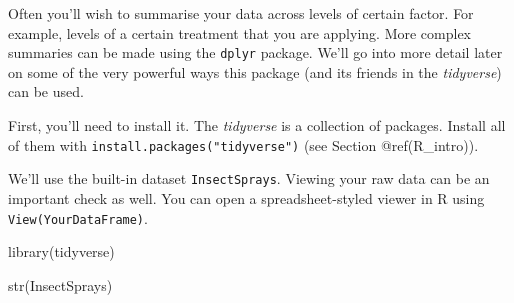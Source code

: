 \documentclass[
  11pt,
  a4paper,
]{book}
\newenvironment{Shaded}{\begin{snugshade}}{\end{snugshade}}
\newcommand{\CommentTok}[1]{\textcolor[rgb]{0.56,0.35,0.01}{\textit{#1}}}
\newcommand{\DecValTok}[1]{\textcolor[rgb]{0.00,0.00,0.81}{#1}}
\newcommand{\FunctionTok}[1]{\textcolor[rgb]{0.00,0.00,0.00}{#1}}
\newcommand{\NormalTok}[1]{#1}
\newcommand{\SpecialCharTok}[1]{\textcolor[rgb]{0.00,0.00,0.00}{#1}}
\newcommand{\StringTok}[1]{\textcolor[rgb]{0.31,0.60,0.02}{#1}}
\begin{document}
\begin{Shaded}
\end{Shaded}

\begin{Shaded}
\end{Shaded}

Often you'll wish to summarise your data across levels of certain factor. For example, levels of a certain treatment that you are applying. More complex summaries can be made using the \texttt{dplyr} package. We'll go into more detail later on some of the very powerful ways this package (and its friends in the \emph{tidyverse}) can be used.

First, you'll need to install it. The \emph{tidyverse} is a collection of packages. Install all of them with \texttt{install.packages("tidyverse")} (see Section @ref(R\_intro)).

We'll use the built-in dataset \texttt{InsectSprays}. Viewing your raw data can be an important check as well. You can open a spreadsheet-styled viewer in R using \texttt{View(YourDataFrame)}.

\begin{Shaded}
\begin{Highlighting}[]
\FunctionTok{library}\NormalTok{(tidyverse) }
\end{Highlighting}
\end{Shaded}

\begin{Shaded}
\begin{Highlighting}[]
\FunctionTok{str}\NormalTok{(InsectSprays)}
\end{Highlighting}
\end{Shaded}
\end{document}
